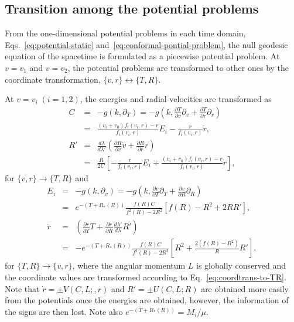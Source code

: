 \documentclass[prd,showpacs,preprintnumbers,groupedaddress,superscriptaddress,nofootinbib,11pt]{revtex4-1} %
\theoremstyle{newplain}
\begin{document}
\subsection{Transition among the potential problems}
From the one-dimensional potential problems in each time domain, Eqs.~\eqref{eq:potential-static} and~\eqref{eq:conformal-pontial-problem}, the null geodesic equation of the spacetime is formulated as a piecewise potential problem.
At $v=v_1$ and $v=v_2$, the potential problems are transformed to other ones by the coordinate transformation, $\{v,r\}\leftrightarrow\{T,R\}$.
\par
At $v=v_i\; (i=1,2)$, the energies and radial velocities are transformed as
\begin{eqnarray}
\label{eq:EtoC}
C&=&-g(k,\partial_T)=-g\left(k,\frac{\partial T}{\partial v}\partial_v+\frac{\partial T}{\partial r}\partial_r \right)\nonumber\\
&=&\frac{(v_i+v_0)f_i(v_i,r)-r}{f_i(v_i,r)}E_i-\frac{r}{f_i(v_i,r)}\dot{r},\\
R'
&=&\frac{d\lambda}{d\lambda'}\left(\frac{\partial R}{\partial v}\dot{v}+\frac{\partial R}{\partial r}\dot{r}\right)\nonumber\\
&=&\frac{R}{2C}\left[-\frac{r}{f_i(v_i,r)}E_i+\frac{(v_i+v_0)f_i(v_i,r)-r}{f_i(v_i,r)}\dot{r}\right],
\end{eqnarray}
for $\{v,r\}\rightarrow\{T,R\}$ and
\begin{eqnarray}
E_i&=&-g(k,\partial_v)=-g\left(k,\frac{\partial v}{\partial T}\partial_T+\frac{\partial v}{\partial R}\partial_R \right)\nonumber\\
&=&e^{-(T+R_*(R))}\frac{f(R)C}{f^2(R)-2R^2}\left[f(R)-R^2+2RR'\right],\\
\dot{r}&=&\left(\frac{\partial r}{\partial T}\dot{T}+\frac{\partial r}{\partial R}\frac{d\lambda'}{d\lambda}R'\right)\nonumber\\
&=&-e^{-(T+R_*(R))}\frac{f(R)C}{f^2(R)-2R^2}\left[R^2+\frac{2(f(R)-R^2)}{R}R'\right],
\end{eqnarray}
for $\{T,R\}\rightarrow\{v,r\}$, where the angular momentum $L$ is globally conserved and the coordinate values are transformed according to Eq.~\eqref{eq:coordtrans-to-TR}.
Note that $\dot{r}=\pm V(C,L;,r)$ and $R'=\pm U(C,L;R)$ are obtained more easily from the potentials once the energies are obtained, however, the information of the signs are then lost.
Note also $e^{-(T+R_*(R))}=M_i/\mu$.
\end{document}

